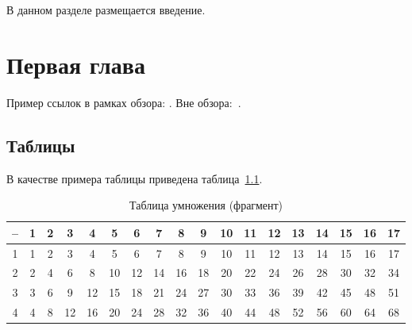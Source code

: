 \documentclass[specification,annotation,times]{itmo-student-thesis}
\begin{document}


\tableofcontents

\startprefacepage

В данном разделе размещается введение.

\chapter{Первая глава}

\startrelatedwork
Пример ссылок в рамках обзора: \cite{example-english, example-russian, unrestricted-jump-evco, nsga-ii-steady-state}.
\finishrelatedwork
Вне обзора:~\cite{bellman}.

\section{Таблицы}

В качестве примера таблицы приведена таблица~\ref{tab1}.

\begin{table}[!h]
\caption{Таблица умножения (фрагмент)}\label{tab1}
\centering
\begin{tabular}{|*{18}{c|}}\hline
-- & 1 & 2 & 3 & 4 & 5 & 6 & 7 & 8 & 9 & 10 & 11 & 12 & 13 & 14 & 15 & 16 & 17 \\\hline
1  & 1 & 2 & 3 & 4 & 5 & 6 & 7 & 8 & 9 & 10 & 11 & 12 & 13 & 14 & 15 & 16 & 17 \\\hline
2  & 2 & 4 & 6 & 8 & 10 & 12 & 14 & 16 & 18 & 20 & 22 & 24 & 26 & 28 & 30 & 32 & 34 \\\hline
3  & 3 & 6 & 9 & 12 & 15 & 18 & 21 & 24 & 27 & 30 & 33 & 36 & 39 & 42 & 45 & 48 & 51 \\\hline
4  & 4 & 8 & 12 & 16 & 20 & 24 & 28 & 32 & 36 & 40 & 44 & 48 & 52 & 56 & 60 & 64 & 68 \\\hline
\end{tabular}
\end{table}
\end{document}
